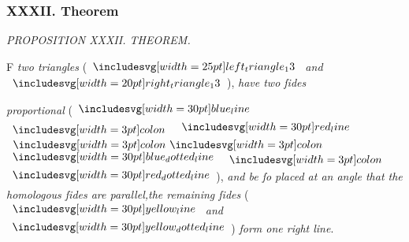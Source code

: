 \documentclass[11pt,preview]{standalone}
\begin{document}
\subsubsection{XXXII. Theorem}

\begin{minipage}[t]{0.54\textwidth}
    \begin{center}
        \textit{PROPOSITION XXXII. THEOREM.}\label{book6pr32} \\
    \end{center}

    \hfill

    \begin{center}
        \raggedright \lettrine[lines=3, loversize=1, nindent=0pt]{}{}F \textit{two triangles} (\hspace{-1ex}$\img{left_triangle_13}$ \textit{and}\\ $\img[0][0][20]{right_triangle_13}$\hspace{-1ex}), \textit{have two ſides}
    \end{center}
    \raggedright \textit{proportional} (\hspace{-1ex}$\blueline$ $\bcolon$ $\redline$ $\bbcolon$ $\dottedblueline$ $\bcolon$ $\dottedredline$\hspace{-1ex}), \textit{and be ſo placed at an angle that the homologous ſides are parallel,the remaining ſides} (\hspace{-1ex}$\yellowline$ \textit{and} $\dottedyellowline$\hspace{-1ex}) \textit{form one right line}.
\end{minipage}%
\hfill
\begin{minipage}[t]{0.43\textwidth}
    \vspace{20pt}
    
\end{minipage}%

\hfill
\end{document}

